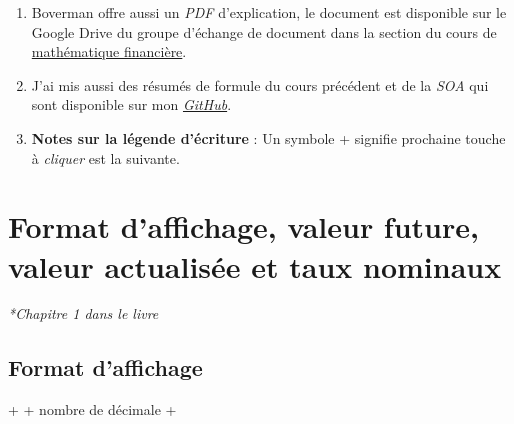 \begin{enumerate}
\item Boverman offre aussi un \emph{PDF} d'explication, le document est disponible sur le Google Drive du groupe d'échange de document dans la section du cours de \href{https://drive.google.com/open?id=0B6kXivc6X9LITmdBVFVWSDAxeE0}{mathématique financière}.
\item J'ai mis aussi des résumés de formule du cours précédent et de la \emph{SOA} qui sont disponible sur mon \href{https://rawgit.com/davebulaval/Study_material_act/master/Résumé\%20FM/ResumeFM_ASM10e.pdf}{\emph{GitHub}}.
\item \textbf{Notes sur la légende d'écriture} : 
Un symbole + signifie prochaine touche à \textit{cliquer} est la suivante.

\end{enumerate}

\section{Format d'affichage, valeur future, valeur actualisée et taux nominaux}

\textit{*Chapitre 1 dans le livre}

\subsection{Format d'affichage}
 +  + nombre de décimale + 

